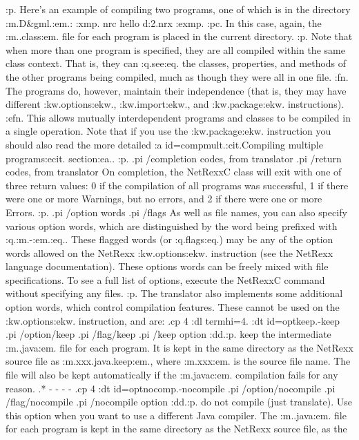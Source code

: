 :p.
Here's an example of compiling two programs, one of which is in the
directory :m.D&gml.\myprograms:em.:
:xmp.
nrc hello d:\myprograms\test2.nrx
:exmp.
:pc.
In this case, again, the :m..class:em. file for each program is placed
in the current directory.
:p.
Note that when more than one program is specified, they are all compiled
within the same class context.  That is, they can :q.see:eq. the
classes, properties, and methods of the other programs being compiled,
much as though they were all in one file.
:fn.
The programs do, however, maintain their independence (that is, they may
have different :kw.options:ekw., :kw.import:ekw., and :kw.package:ekw.
instructions).
:efn.
This allows mutually interdependent programs and classes to be compiled
in a single operation.
Note that if you use the :kw.package:ekw. instruction you should also
read the more detailed :a id=compmult.:cit.Compiling multiple
programs:ecit. section:ea..
:p.
.pi /completion codes, from translator
.pi /return codes, from translator
On completion, the NetRexxC class will exit with one of three return
values: 0 if the compilation of all programs was successful, 1 if there
were one or more Warnings, but no errors, and 2 if there were one or
more Errors.
:p.
.pi /option words
.pi /flags
As well as file names, you can also specify various option words, which
are distinguished by the word being prefixed with :q.:m.-:em.:eq..  These
flagged words (or :q.flags:eq.) may be any of the option words allowed
on the NetRexx :kw.options:ekw. instruction (see the NetRexx language
documentation).  These options words can be freely mixed with file
specifications.  To see a full list of options, execute the NetRexxC
command without specifying any files.
:p.
The translator also implements some additional option words, which
control compilation features.  These cannot be used on the
:kw.options:ekw. instruction, and are:
.cp 4
:dl termhi=4.
:dt id=optkeep.-keep
.pi /option/keep
.pi /flag/keep
.pi /keep option
:dd.:p.
keep the intermediate :m..java:em. file for each program.  It is kept in
the same directory as the NetRexx source file as :m.xxx.java.keep:em.,
where :m.xxx:em. is the source file name.  The file will also be kept
automatically if the :m.javac:em. compilation fails for any reason.
.* - - - -
.cp 4
:dt id=optnocomp.-nocompile
.pi /option/nocompile
.pi /flag/nocompile
.pi /nocompile option
:dd.:p.
do not compile (just translate).  Use this option when you want to use a
different Java compiler.  The :m..java:em. file for each program is kept
in the same directory as the NetRexx source file, as the
